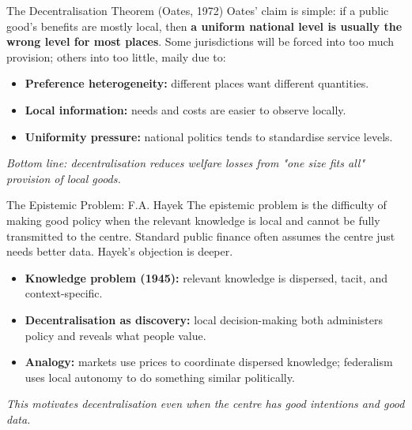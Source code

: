 \documentclass[10pt]{beamer}
\begin{document}
\begin{frame}{The Decentralisation Theorem (Oates, 1972)}
Oates’ claim is simple: if a public good’s benefits are mostly local, then \textbf{a uniform national level is usually the wrong level for most places}.
Some jurisdictions will be forced into too much provision; others into too little, maily due to:

\vspace{0.2cm}
\begin{itemize}
\item \textbf{Preference heterogeneity:} different places want different quantities.
\item \textbf{Local information:} needs and costs are easier to observe locally.
\item \textbf{Uniformity pressure:} national politics tends to standardise service levels.
\end{itemize}

\vspace{0.15cm}
\footnotesize
\textit{Bottom line: decentralisation reduces welfare losses from "one size fits all" provision of local goods.}
\end{frame}

\begin{frame}{The Epistemic Problem: F.A. Hayek}
The epistemic problem is the difficulty of making good policy when the relevant knowledge is local and cannot be fully transmitted to the centre. Standard public finance often assumes the centre just needs better data. Hayek’s objection is deeper.

\begin{itemize}
\item \textbf{Knowledge problem (1945):} relevant knowledge is dispersed, tacit, and context-specific.
\item \textbf{Decentralisation as discovery:} local decision-making both administers policy and reveals what people value.
\item \textbf{Analogy:} markets use prices to coordinate dispersed knowledge; federalism uses local autonomy to do something similar politically.

\end{itemize}

\vspace{0.15cm}
\footnotesize
\textit{This motivates decentralisation even when the centre has good intentions and good data.}
\end{frame}
\end{document}
